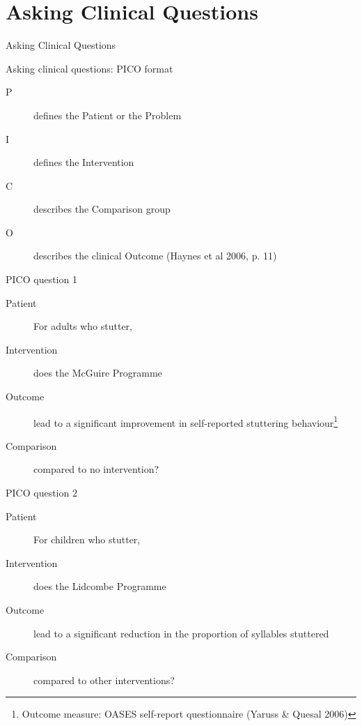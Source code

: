 \documentclass{beamer}
\begin{document}
\section*{Asking Clinical Questions}

\begin{frame}
\begin{center}
\Huge{Asking Clinical Questions}
\end{center}
\end{frame}

\begin{frame}{Asking clinical questions: PICO format}
	\begin{description}
	\item[P] defines the Patient or the Problem
	\item[I] defines the Intervention
	\item[C] describes the Comparison group
	\item[O] describes the clinical Outcome (Haynes et al 2006, p. 11)
	\end{description} 
\end{frame}

\begin{frame}{PICO question 1}
	\begin{description}
	\item[Patient] For adults who stutter,
	\item[Intervention] does the McGuire Programme
	\item [Outcome] lead to a significant improvement in self-reported stuttering behaviour\footnote{\scriptsize{Outcome measure: OASES self-report questionnaire (Yaruss \& Quesal 2006)}}
	\item[Comparison] compared to no intervention?
	\end{description}
\end{frame}

\begin{frame}{PICO question 2}
	\begin{description}
	\item[Patient] For children who stutter,
	\item[Intervention] does the Lidcombe Programme
	\item[Outcome] lead to a significant reduction in the proportion of syllables stuttered
	\item[Comparison] compared to other interventions?
	\end{description}
\end{frame}
\end{document}
